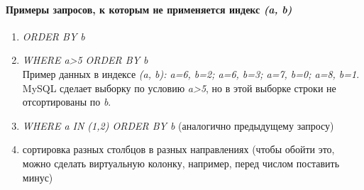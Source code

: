 \paragraph{Примеры запросов, к которым не применяется индекс \textit{(a, b)}}

\begin{enumerate}
\item \textit{ORDER BY b}
\item \textit{WHERE a>5 ORDER BY b} \\
Пример данных в индексе \textit{(a, b): a=6, b=2; a=6, b=3; a=7, b=0; a=8, b=1}. MySQL сделает выборку по условию \textit{a>5}, но в этой выборке строки не отсортированы по \textit{b}.
\item \textit{WHERE a IN (1,2) ORDER BY b} (аналогично предыдущему запросу)
\item сортировка разных столбцов в разных направлениях (чтобы обойти это, можно сделать виртуальную колонку, например, перед числом поставить минус)
\end{enumerate}
